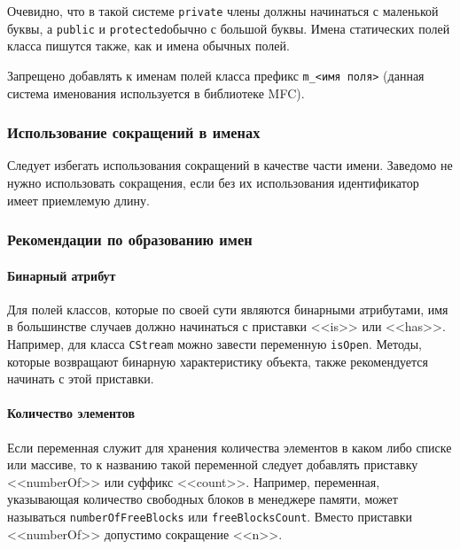 Очевидно, что в такой системе \lstinline|private| члены должны начинаться с маленькой буквы, а \lstinline|public| и \lstinline|protected|\mdash обычно с большой буквы.
Имена статических полей класса пишутся также, как и имена обычных полей.

Запрещено добавлять к именам полей класса префикс \lstinline|m_<имя поля>| (данная система именования используется в библиотеке MFC).

\subsubsection{Использование сокращений в именах}

Следует избегать использования сокращений в качестве части имени. Заведомо не нужно использовать сокращения, если без их использования идентификатор имеет приемлемую длину.

\subsubsection{Рекомендации по образованию имен}

\paragraph{Бинарный атрибут}

Для полей классов, которые по своей сути являются бинарными атрибутами, имя в большинстве случаев должно начинаться с приставки <<is>> или <<has>>. Например, для класса \lstinline|СStream| можно завести переменную \lstinline|isOpen|. Методы, которые возвращают бинарную характеристику объекта, также рекомендуется начинать с этой приставки.

\paragraph{Количество элементов}

Если переменная служит для хранения количества элементов в каком либо списке или массиве, то к названию такой переменной следует добавлять приставку <<numberOf>> или суффикс <<count>>. Например, переменная, указывающая количество свободных блоков в менеджере памяти, может называться \lstinline|numberOfFreeBlocks| или \lstinline|freeBlocksCount|. Вместо приставки <<numberOf>> допустимо сокращение <<n>>.

